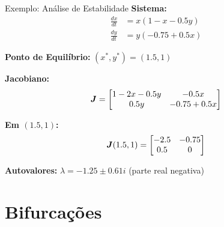 \begin{frame}[allowframebreaks]{Exemplo: Análise de Estabilidade}
\textbf{Sistema:}
\begin{align*}
\frac{dx}{dt} &= x(1 - x - 0.5y)\\
\frac{dy}{dt} &= y(-0.75 + 0.5x)
\end{align*}

\vspace{0.3cm}

\textbf{Ponto de Equilíbrio:} $(x^*, y^*) = (1.5, 1)$

\vspace{0.3cm}

\textbf{Jacobiano:}
\begin{equation*}
\boldsymbol{J} = \begin{bmatrix}
1 - 2x - 0.5y & -0.5x\\
0.5y & -0.75 + 0.5x
\end{bmatrix}
\end{equation*}

\textbf{Em $(1.5, 1)$:}
\begin{equation*}
\boldsymbol{J}(1.5, 1) = \begin{bmatrix}
-2.5 & -0.75\\
0.5 & 0
\end{bmatrix}
\end{equation*}

\textbf{Autovalores:} $\lambda = -1.25 \pm 0.61i$ (parte real negativa)

\end{frame}

\section{Bifurcações}

